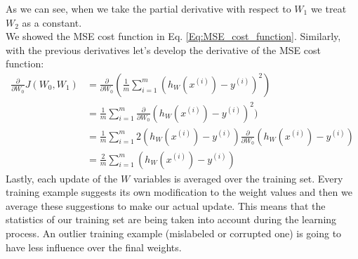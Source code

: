 As we can see, when we take the partial derivative with respect to $W_1$ we treat $W_2$ as a constant.\\
We showed the MSE cost function in Eq. \ref{Eq:MSE_cost_function}. Similarly, with the previous derivatives let's develop the derivative of the MSE cost function:
\begin{align*}
\frac{\partial}{\partial W_0}J(W_0,W_1) &= \frac{\partial}{\partial W_0}(\frac{1}{m}\sum_{i=1}^m (h_W(x^{(i)})-y^{(i)})^2)\\
&= \frac{1}{m}\sum_{i=1}^m \frac{\partial}{\partial W_0}(h_W(x^{(i)})-y^{(i)})^2)\\
&= \frac{1}{m}\sum_{i=1}^m 2(h_W(x^{(i)})-y^{(i)})\frac{\partial}{\partial W_0}(h_W(x^{(i)})-y^{(i)})\\
&= \frac{2}{m}\sum_{i=1}^m(h_W(x^{(i)})-y^{(i)})
\end{align*}
Lastly, each update of the $W$ variables is averaged over the training set. Every training example suggests its own modification to the weight values and then we average these suggestions to make our actual update. This means that the statistics of our training set are being taken into account during the learning process. An outlier training example (mislabeled or corrupted one) is going to have less influence over the final weights. \cite{mccormickml} \\
